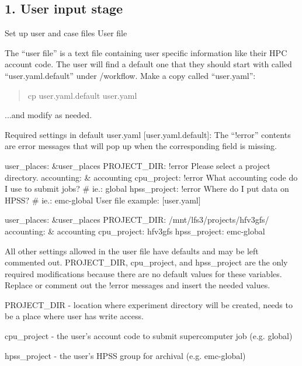 \subsection*{1. User input stage }

Set up user and case files User file

The “user file” is a text file containing user specific information like their H\-P\-C account code. The user will find a default one that they should start with called “user.\-yaml.\-default” under /workflow. Make a copy called “user.\-yaml”\-:

\begin{quotation}
cp user.\-yaml.\-default user.\-yaml

\end{quotation}


...and modify as needed.

Required settings in default user.\-yaml \mbox{[}user.\-yaml.\-default\mbox{]}\-: The “!error” contents are error messages that will pop up when the corresponding field is missing.

user\-\_\-places\-: \&user\-\_\-places P\-R\-O\-J\-E\-C\-T\-\_\-\-D\-I\-R\-: !error Please select a project directory. accounting\-: \& accounting cpu\-\_\-project\-: !error What accounting code do I use to submit jobs? \# ie.\-: global hpss\-\_\-project\-: !error Where do I put data on H\-P\-S\-S? \# ie.\-: emc-\/global User file example\-: \mbox{[}user.\-yaml\mbox{]}

user\-\_\-places\-: \&user\-\_\-places P\-R\-O\-J\-E\-C\-T\-\_\-\-D\-I\-R\-: /mnt/lfs3/projects/hfv3gfs/ accounting\-: \& accounting cpu\-\_\-project\-: hfv3gfs hpss\-\_\-project\-: emc-\/global

All other settings allowed in the user file have defaults and may be left commented out. P\-R\-O\-J\-E\-C\-T\-\_\-\-D\-I\-R, cpu\-\_\-project, and hpss\-\_\-project are the only required modifications because there are no default values for these variables. Replace or comment out the !error messages and insert the needed values.


\begin{DoxyItemize}
\item P\-R\-O\-J\-E\-C\-T\-\_\-\-D\-I\-R -\/ location where experiment directory will be created, needs to be a place where user has write access.
\item cpu\-\_\-project -\/ the user’s account code to submit supercomputer job (e.\-g. global)
\item hpss\-\_\-project -\/ the user’s H\-P\-S\-S group for archival (e.\-g. emc-\/global)
\end{DoxyItemize}

